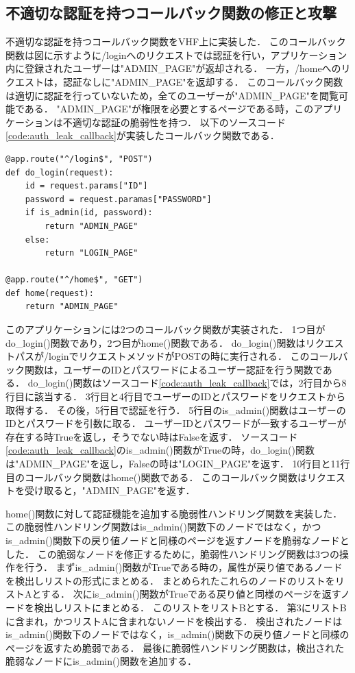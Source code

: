\documentclass[a4paper,12pt]{jreport}
\begin{document}
\subsection{不適切な認証を持つコールバック関数の修正と攻撃}
不適切な認証を持つコールバック関数をVHF上に実装した．
このコールバック関数は図に示すように/loginへのリクエストでは認証を行い，アプリケーション内に登録されたユーザーは"ADMIN\_PAGE"が返却される．
一方，/homeへのリクエストは，認証なしに"ADMIN\_PAGE"を返却する．
このコールバック関数は適切に認証を行っていないため，全てのユーザーが"ADMIN\_PAGE"を閲覧可能である．
"ADMIN\_PAGE"が権限を必要とするページである時，このアプリケーションは不適切な認証の脆弱性を持つ．
以下のソースコード\ref{code:auth_leak_callback}が実装したコールバック関数である．
\begin{lstlisting}[caption={A vulnerable function which has an authentication leak.}, label=code:auth_leak_callback, captionpos=b]
@app.route("^/login$", "POST")
def do_login(request):
    id = request.params["ID"]
    password = request.paramas["PASSWORD"]
    if is_admin(id, password):
        return "ADMIN_PAGE"
    else:
        return "LOGIN_PAGE"

@app.route("^/home$", "GET")
def home(request):
    return "ADMIN_PAGE"
\end{lstlisting}

このアプリケーションには2つのコールバック関数が実装された．
1つ目がdo\_login()関数であり，2つ目がhome()関数である．
do\_login()関数はリクエストパスが/loginでリクエストメソッドがPOSTの時に実行される．
このコールバック関数は，ユーザーのIDとパスワードによるユーザー認証を行う関数である．
do\_login()関数はソースコード\ref{code:auth_leak_callback}では，2行目から8行目に該当する．
3行目と4行目でユーザーのIDとパスワードをリクエストから取得する．
その後，5行目で認証を行う．
5行目のis\_admin()関数はユーザーのIDとパスワードを引数に取る．
ユーザーIDとパスワードが一致するユーザーが存在する時Trueを返し，そうでない時はFalseを返す．
ソースコード\ref{code:auth_leak_callback}のis\_admin()関数がTrueの時，do\_login()関数は"ADMIN\_PAGE"を返し，Falseの時は"LOGIN\_PAGE"を返す．
10行目と11行目のコールバック関数はhome()関数である．
このコールバック関数はリクエストを受け取ると，"ADMIN\_PAGE"を返す．

home()関数に対して認証機能を追加する脆弱性ハンドリング関数を実装した．
この脆弱性ハンドリング関数はis\_admin()関数下のノードではなく，かつis\_admin()関数下の戻り値ノードと同様のページを返すノードを脆弱なノードとした．
この脆弱なノードを修正するために，脆弱性ハンドリング関数は3つの操作を行う．
まずis\_admin()関数がTrueである時の，属性が戻り値であるノードを検出しリストの形式にまとめる．
まとめられたこれらのノードのリストをリストAとする．
次にis\_admin()関数がTrueである戻り値と同様のページを返すノードを検出しリストにまとめる．
このリストをリストBとする．
第3にリストBに含まれ，かつリストAに含まれないノードを検出する．
検出されたノードはis\_admin()関数下のノードではなく，is\_admin()関数下の戻り値ノードと同様のページを返すため脆弱である．
最後に脆弱性ハンドリング関数は，検出された脆弱なノードにis\_admin()関数を追加する．
\end{document}
